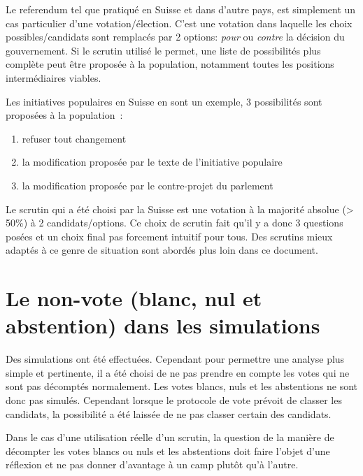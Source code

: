 \documentclass[../report]{subfiles}
\begin{document}
  Le referendum tel que pratiqué en Suisse et dans d'autre pays, est simplement un cas particulier d'une votation/élection. 
  C'est une votation dans laquelle les choix possibles/candidats sont remplacés par 2 options: \emph{pour} ou \emph{contre} la décision
  du gouvernement.
  Si le scrutin utilisé le permet, une liste de possibilités plus complète peut être proposée à la population, notamment 
  toutes les positions intermédiaires viables. 
  
  Les initiatives populaires en Suisse en sont un exemple, 3 possibilités sont proposées à la population~: 
  \begin{enumerate}
  	\item refuser tout changement
  	\item la modification proposée par le texte de l'initiative populaire
  	\item la modification proposée par le contre-projet du parlement
  \end{enumerate}
  
  Le scrutin qui a été choisi par la Suisse est une votation à la majorité absolue (> 50\%) à 2 candidats/options.
  Ce choix de scrutin fait qu'il y a donc 3 questions posées et un choix final pas forcement intuitif pour tous.
  Des scrutins mieux adaptés à ce genre de situation sont abordés plus loin dans ce document.
  
  
  \section[Le non-vote dans les simulations]{Le non-vote (blanc, nul et abstention) dans les simulations}
  
  Des simulations ont été effectuées. Cependant pour permettre une analyse plus simple et pertinente, il a été choisi de ne 
  pas prendre en compte les votes qui ne sont pas décomptés normalement.
  Les votes blancs, nuls et les abstentions ne sont donc pas simulés. Cependant lorsque le protocole de vote prévoit de 
  classer les candidats, la possibilité a été laissée de ne pas classer certain des candidats.
  
  Dans le cas d'une utilisation réelle d'un scrutin, la question de la manière de décompter les votes blancs ou nuls et les abstentions 
  doit faire l'objet d'une réflexion et ne pas donner d'avantage à un camp plutôt qu'à l'autre.
  
\end{document}
